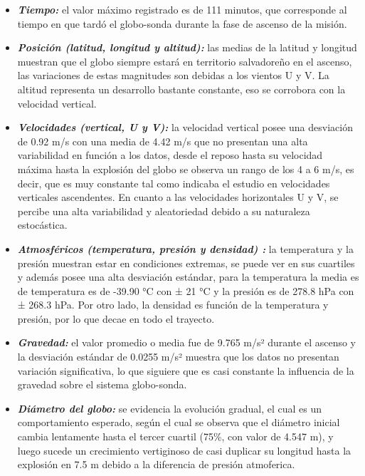     \begin{itemize}
        \item \textbf{\textit{Tiempo:}} el valor máximo registrado es de 111 minutos, que corresponde al tiempo en que tardó el globo-sonda durante la fase de ascenso de la misión.
        \item \textbf{\textit{Posición (latitud, longitud y altitud):}  }las medias de la latitud y longitud muestran que el globo siempre estará en territorio salvadoreño en el ascenso, las variaciones de estas magnitudes son debidas a los vientos U y V. La altitud representa un desarrollo bastante constante, eso se corrobora con la velocidad vertical.
        \item \textbf{\textit{Velocidades (vertical, U y V):}}  la velocidad vertical posee una desviación de 0.92 m/s con una media de 4.42 m/s  que no presentan una alta variabilidad en función a los datos, desde el reposo hasta su velocidad máxima hasta la explosión del globo se observa un rango de los 4 a 6 m/s, es decir,  que es muy constante tal como indicaba el estudio \cite{ascentRate_weatherBallon} en velocidades verticales ascendentes. En cuanto a las velocidades horizontales U y V,  se percibe una alta variabilidad y aleatoriedad debido a su naturaleza estocástica. 
        \item \textbf{\textit{Atmosféricos (temperatura, presión y densidad) :}} la temperatura y la presión muestran estar en condiciones extremas, se puede ver en sus cuartiles y además posee una alta desviación estándar, para la temperatura la media es de temperatura es de -39.90 °C  con ± 21  °C  y la presión es de 278.8 hPa con  ± 268.3 hPa. Por otro lado, la densidad es función de la temperatura y presión, por lo que decae en todo el trayecto.
        \item  \textbf{\textit{Gravedad:}} el valor promedio o media fue de  9.765 m/s² durante el ascenso y la desviación estándar de 0.0255 m/s² muestra que los datos no presentan variación significativa, lo que siguiere que es casi constante la influencia de la gravedad sobre el sistema globo-sonda.
        \item  \textbf{\textit{Diámetro del globo:}} se evidencia la evolución gradual, el cual es un comportamiento esperado, según el cual se observa que el  diámetro inicial cambia lentamente hasta el tercer cuartil (75\%, con valor de 4.547 m), y luego sucede un crecimiento vertiginoso de casi duplicar su longitud hasta la explosión en 7.5 m debido a la diferencia de presión atmoferica.
    \end{itemize}

